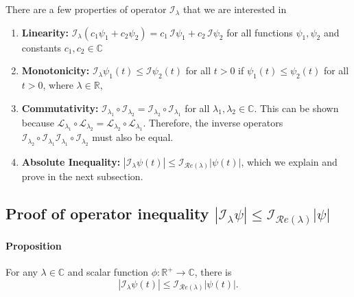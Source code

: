 \documentclass[accepted]{uai2023}
\renewcommand{\L}{\mathcal{L}}
\newcommand{\I}{\mathcal{I}}
\renewcommand{\Re}[1]{\mathcal{R}e\left(#1\right)}
\begin{document}
    There are a few properties of operator $\I_{\lambda}$ that we are interested in
    \begin{enumerate}
        \item \textbf{Linearity:} $\I_{\lambda} (c_1\psi_1 + c_2\psi_2) = c_1\,\I\psi_1 + c_2\,\I\psi_2$ for all functions $\psi_1, \psi_2$ and constants $c_1, c_2 \in \mathbb{C}$
        \item \textbf{Monotonicity:} $\I_\lambda \psi_1(t) \leq \I\psi_2(t)$ for all $t > 0$ if $\psi_1(t) \leq \psi_2(t)$ for all $t > 0$, where $\lambda \in \mathbb{R}$,
        \item \textbf{Commutativity:} $\I_{\lambda_1} \circ \I_{\lambda_2} = \I_{\lambda_2} \circ \I_{\lambda_1} $ for all $\lambda_1, \lambda_2 \in \mathbb{C}$. This can be shown because $\L_{\lambda_1}\circ\L_{\lambda_2} = \L_{\lambda_2} \circ \L_{\lambda_1}$. Therefore, the inverse operators $\I_{\lambda_2} \circ \I_{\lambda_1} \I_{\lambda_1}\circ\I_{\lambda_2}$ must also be equal.
        \item \textbf{Absolute Inequality:} $|\I_\lambda \psi(t)| \leq \I_{\Re{\lambda}}|\psi(t)|$, which we explain and prove in the next subsection.
    \end{enumerate}

\subsection{Proof of operator inequality $|\I_\lambda \psi| \leq \I_{\Re{\lambda}}|\psi|$}
    \paragraph{Proposition} For any $\lambda \in \mathbb{C}$ and scalar function $\phi: \mathbb{R}^{+} \to \mathbb{C}$, there is 
    \begin{equation}\label{eq:operator-I-inequality}
        |\I_\lambda \psi(t)| \leq \I_{\Re{\lambda}}|\psi(t)|.
    \end{equation}
\end{document}
